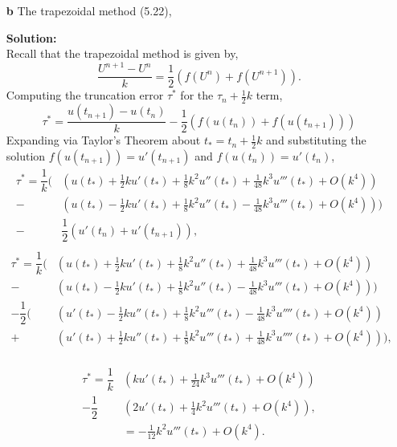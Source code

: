 \documentclass[12pt]{article}
\makeatletter
\theoremstyle{homework}
\newenvironment{exercise}[1]
{\def\@currentlabel{#1}\exercisecore}
{\endexercisecore}
\newcommand{\localhead}[1]{\par\smallskip\noindent\textbf{#1}\nobreak\\}%
\newcommand\solution{\localhead{Solution:}}
\makeatother
\begin{document}
\begin{exercise}{Problem P28}
\begin{enumerate}
    \item[\textbf{b}] The trapezoidal method (5.22),
    \solution Recall that the trapezoidal method is given by, 
    \begin{equation*}
      \dfrac{U^{n+1} - U^n}{k} = \frac{1}{2}(f(U^n) + f(U^{n+1})).
    \end{equation*}
    Computing the truncation error $\tau^*$ for the $\tau_n + \frac{1}{2}k$ term,  
    \begin{equation*}
      \tau^* = \dfrac{u(t_{n+1})-u(t_{n})}{k} - \frac{1}{2}(f(u(t_{n})) + f(u(t_{n+1})))
    \end{equation*}
    Expanding via Taylor's Theorem about $t_* = t_n + \frac{1}{2}k$ and substituting the solution $f(u({t_{n+1}})) = u'(t_{n+1})$ and $f(u({t_{n}})) = u'(t_{n})$,
    \begin{align*}
      \tau^* = \dfrac{1}{k}  \biggl(&\left(u(t_*) + \frac{1}{2}ku'(t_{*}) + \frac{1}{8}k^2u''(t_{*}) + \frac{1}{48}k^3u'''(t_{*}) + O(k^4)\right)\\
      - &\left(u(t_*) - \frac{1}{2}ku'(t_{*}) + \frac{1}{8}k^2u''(t_{*}) - \frac{1}{48}k^3u'''(t_{*}) + O(k^4)\right)\biggr)\\
      - &\dfrac{1}{2}\left(u'(t_{n}) + u'(t_{n + 1})\right),\\
    \end{align*}
    \begin{align*}
      \tau^* = \dfrac{1}{k}  \biggl(&\left(u(t_*) + \frac{1}{2}ku'(t_{*}) + \frac{1}{8}k^2u''(t_{*}) + \frac{1}{48}k^3u'''(t_{*}) + O(k^4)\right)\\
      - &\left(u(t_*) - \frac{1}{2}ku'(t_{*}) + \frac{1}{8}k^2u''(t_{*}) - \frac{1}{48}k^3u'''(t_{*}) + O(k^4)\right)\biggr)\\
      - \dfrac{1}{2}  \biggl(&\left(u'(t_{*}) - \frac{1}{2}ku''(t_{*}) + \frac{1}{8}k^2u'''(t_{*}) - \frac{1}{48}k^3u''''(t_{*}) + O(k^4)\right)\\
      + &\left( u'(t_{*}) + \frac{1}{2}ku''(t_{*}) + \frac{1}{8}k^2u'''(t_{*}) + \frac{1}{48}k^3u''''(t_{*}) + O(k^4)\right)\biggr),\\
    \end{align*}

    \begin{align*}
      \tau^* = \dfrac{1}{k}&\left(  ku'(t_{*})+\frac{1}{24}k^3u'''(t_{*}) + O(k^4)\right)\\
      - \dfrac{1}{2}&\left(2u'(t_{*}) + \frac{1}{4}k^2u'''(t_{*}) + O(k^4)\right),\\
      &=-\frac{1}{12}k^2u'''(t_{*}) + O(k^4).
    \end{align*}


\end{enumerate}
\end{exercise}
\end{document}
